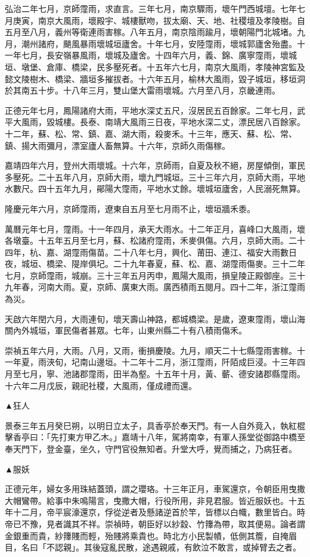 \begin{pinyinscope}
弘治二年七月，京師霪雨，求直言。三年七月，南京驟雨，壞午門西城壇。七年七月庚寅，南京大風雨，壞殿宇、城樓獸吻，拔太廟、天、地、社稷壇及孝陵樹。自五月至八月，義州等衛連雨害稼。八年五月，南京陰雨踰月，壞朝陽門北城堵。九月，潮州諸府，颶風暴雨壞城垣廬舍。十年七月，安陸霪雨，壞城郭廬舍殆盡。十一年七月，長安嶺暴風雨，壞城及廬舍。十四年六月，義、錦、廣寧霪雨，壞城垣、墩堡、倉庫、橋梁，民多壓死者。十五年六七月，南京大風雨，孝陵神宮監及懿文陵樹木、橋梁、牆垣多摧拔者。十六年五月，榆林大風雨，毀子城垣，移垣洞於其南五十步。十八年三月，雙山堡大雷雨壞城。六月至八月，京畿連雨。

正德元年七月，鳳陽諸府大雨，平地水深丈五尺，沒居民五百餘家。二年七月，武平大風雨，毀城樓。長泰、南靖大風雨三日夜，平地水深二丈，漂民居八百餘家。十二年，蘇、松、常、鎮、嘉、湖大雨，殺麥禾。十三年，應天、蘇、松、常、鎮、揚大雨彌月，漂室廬人畜無算。十六年，京師久雨傷稼。

嘉靖四年六月，登州大雨壞城。十六年，京師雨，自夏及秋不絕，房屋傾倒，軍民多壓死。二十五年八月，京師大雨，壞九門城垣。三十三年六月，京師大雨，平地水數尺。四十五年九月，鄖陽大霪雨，平地水丈餘。壞城垣廬舍，人民溺死無算。

隆慶元年六月，京師霪雨，遼東自五月至七月雨不止，壞垣牆禾黍。

萬曆元年七月，霪雨。十一年四月，承天大雨水。十二年正月，喜峰口大風雨，壞各墩臺。十五年五月至七月，蘇、松諸府霪雨，禾麥俱傷。六月，京師大雨。二十四年，杭、嘉、湖霪雨傷苗。二十八年七月，興化、莆田、連江、福安大雨數日夜，城垣、橋梁、隄岸俱圮。二十九年春夏，蘇、松、嘉、湖霪雨傷麥。三十二年七月，京師霪雨，城崩。三十三年五月丙申，鳳陽大風雨，損皇陵正殿御座。三十九年春，河南大雨。夏，京師、廣東大雨。廣西積雨五閱月。四十二年，浙江霪雨為災。

天啟六年閏六月，大雨連旬，壞天壽山神路，都城橋梁。是歲，遼東霪雨，壞山海關內外城垣，軍民傷者甚眾。七年，山東州縣二十有八積雨傷禾。

崇禎五年六月，大雨。八月，又雨，衝損慶陵。九月，順天二十七縣霪雨害稼。十一年夏，雨浹旬，圮南山邊垣。十二年十二月，浙江霪雨，阡陌成巨浸。十三年四月至七月，寧、池諸郡霪雨，田半為壑。十五年十月，黃、蘄、德安諸郡縣霪雨。十六年二月戊辰，親祀社稷，大風雨，僅成禮而還。

▲狂人

景泰三年五月癸巳朔，以明日立太子，具香亭於奉天門。有一人自外竟入，執紅棍擊香亭曰：「先打東方甲乙木。」嘉靖十八年，駕將南幸，有軍人孫堂從御路中橋至奉天門下，登金臺，坐久，守門官役無知者。升堂大呼，覺而捕之，乃病狂者。

▲服妖

正德元年，婦女多用珠結蓋頭，謂之瓔珞。十三年正月，車駕還京，令朝臣用曳撒大帽鸞帶。給事中朱鳴陽言，曳撒大帽，行役所用，非見君服。皆近服妖也。十五年十二月，帝平宸濠還京，俘從逆者及懸諸逆首於竿，皆標以白幟，數里皆白。時帝已不豫，見者識其不祥。崇禎時，朝臣好以紗縠、竹籜為帶，取其便易。論者謂金銀重而貴，紗籜賤而輕，殆賤將乘貴也。時北方小民製幘，低側其簷，自掩眉目，名曰「不認親」。其後寇亂民散，途遇親戚，有飲泣不敢言，或掉臂去之者。


\end{pinyinscope}
